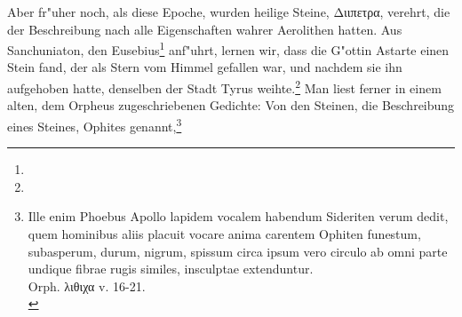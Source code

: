 \documentclass[a4paper, 11pt, oneside, polutonikogreek, german]{article}
\begin{document}
Aber fr"uher noch, als diese Epoche, wurden heilige Steine, Διιπετρα, verehrt, die der Beschreibung nach alle Eigenschaften wahrer Aerolithen hatten. Aus Sanchuniaton, den Eusebius\footnote{} anf"uhrt, lernen wir, dass die G"ottin Astarte einen Stein fand, der als Stern vom Himmel gefallen war, und nachdem sie ihn aufgehoben hatte, denselben der Stadt Tyrus weihte.\footnote{} Man liest ferner in einem alten, dem Orpheus zugeschriebenen Gedichte: Von den Steinen, die Beschreibung eines Steines, Ophites genannt,\footnote{Ille enim Phoebus Apollo lapidem vocalem habendum Sideriten verum dedit, quem hominibus aliis placuit vocare anima carentem Ophiten funestum, subasperum, durum, nigrum, spissum circa ipsum vero circulo ab omni parte undique fibrae rugis similes, insculptae extenduntur.\\
Orph. λιθιχα v. 16-21.\\
}
\end{document}
